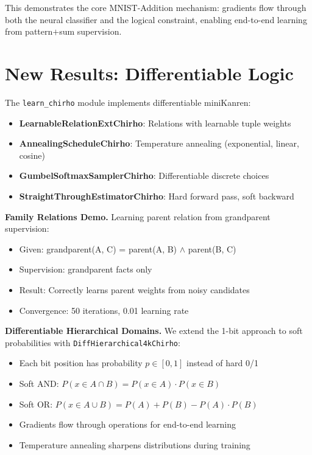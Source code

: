 \documentclass[11pt,a4paper]{article}
\begin{document}
This demonstrates the core MNIST-Addition mechanism: gradients flow through both the neural classifier and the logical constraint, enabling end-to-end learning from pattern$+$sum supervision.

\section{New Results: Differentiable Logic}

The \texttt{learn\_chirho} module implements differentiable miniKanren:
\begin{itemize}
  \item \textbf{LearnableRelationExtChirho}: Relations with learnable tuple weights
  \item \textbf{AnnealingScheduleChirho}: Temperature annealing (exponential, linear, cosine)
  \item \textbf{GumbelSoftmaxSamplerChirho}: Differentiable discrete choices
  \item \textbf{StraightThroughEstimatorChirho}: Hard forward pass, soft backward
\end{itemize}

\textbf{Family Relations Demo.}
Learning parent relation from grandparent supervision:
\begin{itemize}
  \item Given: grandparent(A, C) = parent(A, B) $\land$ parent(B, C)
  \item Supervision: grandparent facts only
  \item Result: Correctly learns parent weights from noisy candidates
  \item Convergence: 50 iterations, 0.01 learning rate
\end{itemize}

\textbf{Differentiable Hierarchical Domains.}
We extend the 1-bit approach to soft probabilities with \texttt{DiffHierarchical4kChirho}:
\begin{itemize}
  \item Each bit position has probability $p \in [0,1]$ instead of hard 0/1
  \item Soft AND: $P(x \in A \cap B) = P(x \in A) \cdot P(x \in B)$
  \item Soft OR: $P(x \in A \cup B) = P(A) + P(B) - P(A) \cdot P(B)$
  \item Gradients flow through operations for end-to-end learning
  \item Temperature annealing sharpens distributions during training
\end{itemize}
\end{document}
